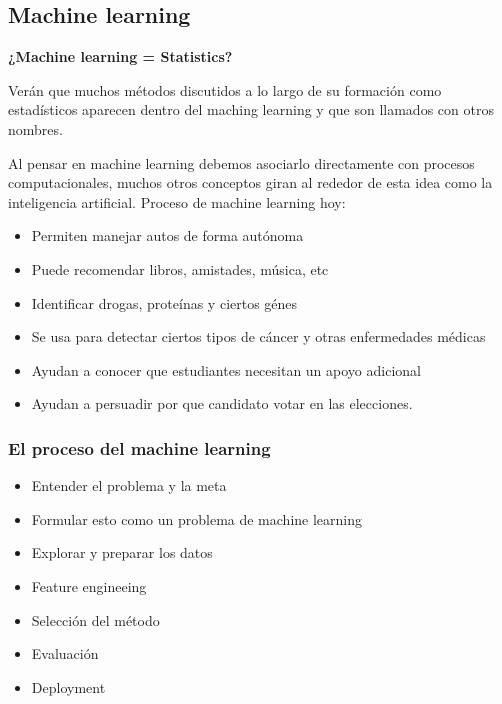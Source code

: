 \documentclass[
]{book}
\providecommand{\tightlist}{%
  \setlength{\itemsep}{0pt}\setlength{\parskip}{0pt}}
\begin{document}
\hypertarget{machine-learning}{%
\subsection{Machine learning}\label{machine-learning}}

\textbf{¿Machine learning = Statistics?}

Verán que muchos métodos discutidos a lo largo de su formación como estadísticos aparecen dentro del maching learning y que son llamados con otros nombres.

Al pensar en machine learning debemos asociarlo directamente con procesos computacionales, muchos otros conceptos giran al rededor de esta idea como la inteligencia artificial. Proceso de machine learning hoy:

\begin{itemize}
\tightlist
\item
  Permiten manejar autos de forma autónoma
\item
  Puede recomendar libros, amistades, música, etc
\item
  Identificar drogas, proteínas y ciertos génes
\item
  Se usa para detectar ciertos tipos de cáncer y otras enfermedades médicas
\item
  Ayudan a conocer que estudiantes necesitan un apoyo adicional
\item
  Ayudan a persuadir por que candidato votar en las elecciones.
\end{itemize}

\hypertarget{el-proceso-del-machine-learning}{%
\subsubsection{El proceso del machine learning}\label{el-proceso-del-machine-learning}}

\begin{itemize}
\tightlist
\item
  Entender el problema y la meta
\item
  Formular esto como un problema de machine learning
\item
  Explorar y preparar los datos
\item
  Feature engineeing
\item
  Selección del método
\item
  Evaluación
\item
  Deployment
\end{itemize}
\end{document}
